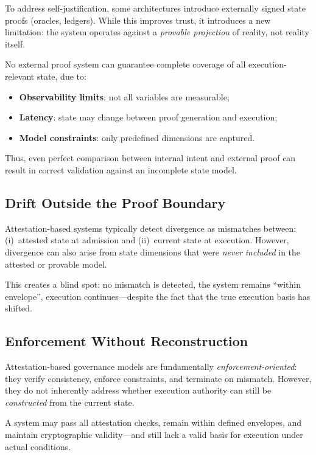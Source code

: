 \documentclass[11pt]{article}
\begin{document}
To address self-justification, some architectures introduce externally signed
state proofs (oracles, ledgers).
While this improves trust, it introduces a new limitation:
the system operates against a \emph{provable projection} of reality, not reality
itself.

No external proof system can guarantee complete coverage of all execution-relevant
state, due to:
\begin{itemize}
  \item \textbf{Observability limits}: not all variables are measurable;
  \item \textbf{Latency}: state may change between proof generation and execution;
  \item \textbf{Model constraints}: only predefined dimensions are captured.
\end{itemize}

Thus, even perfect comparison between internal intent and external proof can
result in correct validation against an incomplete state model.

\subsection{Drift Outside the Proof Boundary}

Attestation-based systems typically detect divergence as mismatches between:
(i)~attested state at admission and (ii)~current state at execution.
However, divergence can also arise from state dimensions that were
\emph{never included} in the attested or provable model.

This creates a blind spot: no mismatch is detected, the system remains
``within envelope'', execution continues---despite the fact that the true
execution basis has shifted.

\subsection{Enforcement Without Reconstruction}

Attestation-based governance models are fundamentally \emph{enforcement-oriented}:
they verify consistency, enforce constraints, and terminate on mismatch.
However, they do not inherently address whether execution authority can still
be \emph{constructed} from the current state.

A system may pass all attestation checks, remain within defined envelopes, and
maintain cryptographic validity---and still lack a valid basis for execution
under actual conditions.
\end{document}
